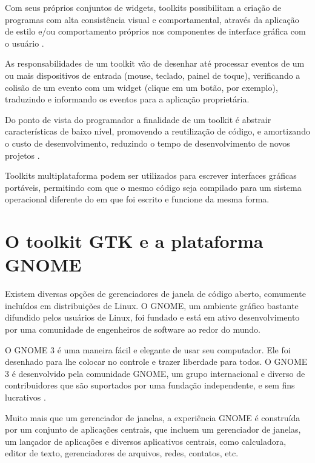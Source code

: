 Com seus próprios conjuntos de widgets, toolkits possibilitam a criação de
programas com alta consistência visual e comportamental, através da aplicação de
estilo e/ou comportamento próprios nos componentes de interface gráfica com o
usuário \cite{myers2000past}.

As responsabilidades de um toolkit vão de desenhar até processar eventos de um
ou mais dispositivos de entrada (mouse, teclado, painel de toque), verificando a
colisão de um evento com um widget (clique em um botão, por exemplo), traduzindo
e informando os eventos para a aplicação proprietária.

Do ponto de vista do programador a finalidade de um toolkit é abstrair
características de baixo nível, promovendo a reutilização de código, e
amortizando o custo de desenvolvimento, reduzindo o tempo de desenvolvimento de
novos projetos .

Toolkits multiplataforma podem ser utilizados para escrever interfaces gráficas
portáveis, permitindo com que o mesmo código seja compilado para um sistema
operacional diferente do em que foi escrito e funcione da mesma forma.

\section{O toolkit GTK e a plataforma GNOME}

Existem diversas opções de gerenciadores de janela de código aberto, comumente
incluídos em distribuições de Linux. O GNOME, um ambiente gráfico bastante
difundido pelos usuários de Linux, foi fundado e está em ativo desenvolvimento
por uma comunidade de engenheiros de software ao redor do mundo.

\begin{citacao}
    O GNOME 3 é uma maneira fácil e elegante de usar seu computador.
    Ele foi desenhado para lhe colocar no controle e trazer liberdade para
    todos. O GNOME 3 é desenvolvido pela comunidade GNOME, um grupo
    internacional e diverso de contribuidores que são suportados por uma
    fundação independente, e sem fins lucrativos \cite{gnome-org}.
\end{citacao}

Muito mais que um gerenciador de janelas, a experiência GNOME é construída por
um conjunto de aplicações centrais, que incluem um gerenciador de janelas, um
lançador de aplicações e diversos aplicativos centrais, como calculadora,
editor de texto, gerenciadores de arquivos, redes, contatos, etc.

